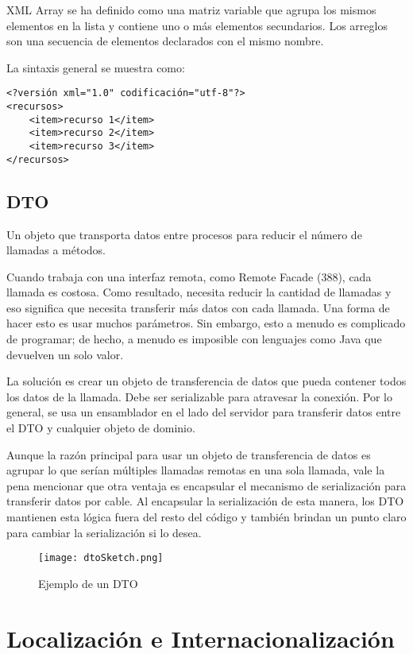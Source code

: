 \begin{enumerate}
XML Array se ha definido como una matriz variable que agrupa los mismos elementos en la lista y contiene uno o más elementos secundarios. Los arreglos son una secuencia de elementos declarados con el mismo nombre.

La sintaxis general se muestra como:

\begin{lstlisting}
<?versión xml="1.0" codificación="utf-8"?>
<recursos>
	<item>recurso 1</item>
	<item>recurso 2</item>
	<item>recurso 3</item>		
</recursos>

\end{lstlisting}

\subsection{DTO}
\cite{mf}Un objeto que transporta datos entre procesos para reducir el número de llamadas a métodos.

Cuando trabaja con una interfaz remota, como Remote Facade (388), cada llamada es costosa. Como resultado, necesita reducir la cantidad de llamadas y eso significa que necesita transferir más datos con cada llamada. Una forma de hacer esto es usar muchos parámetros. Sin embargo, esto a menudo es complicado de programar; de hecho, a menudo es imposible con lenguajes como Java que devuelven un solo valor.

La solución es crear un objeto de transferencia de datos que pueda contener todos los datos de la llamada. Debe ser serializable para atravesar la conexión. Por lo general, se usa un ensamblador en el lado del servidor para transferir datos entre el DTO y cualquier objeto de dominio.

Aunque la razón principal para usar un objeto de transferencia de datos es agrupar lo que serían múltiples llamadas remotas en una sola llamada, vale la pena mencionar que otra ventaja es encapsular el mecanismo de serialización para transferir datos por cable. Al encapsular la serialización de esta manera, los DTO mantienen esta lógica fuera del resto del código y también brindan un punto claro para cambiar la serialización si lo desea.

\begin{figure}[H]
	\center
	\texttt{[image: dtoSketch.png]}
	\caption{Ejemplo de un DTO}
\end{figure}

\section{Localización e Internacionalización}


\end{enumerate}
